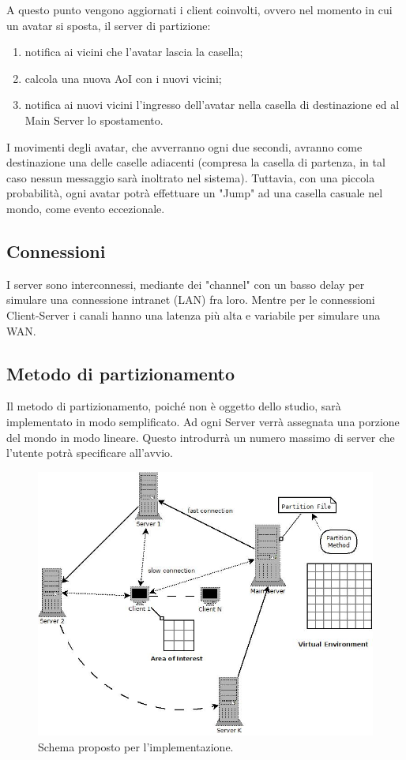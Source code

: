 \documentclass[a4paper, 11pt, oneside]{book}
\theoremstyle{definition}
\theoremstyle{remark}
\begin{document}
A questo punto vengono aggiornati i client coinvolti, ovvero nel momento
in cui un avatar si sposta, il server di partizione:
\begin{enumerate}
\item
notifica ai vicini che l'avatar lascia la casella;
\item
calcola una nuova AoI con i nuovi vicini;
\item
notifica ai nuovi vicini l'ingresso dell'avatar nella casella di
destinazione ed al Main Server lo spostamento.
\end{enumerate}

I movimenti degli avatar, che avverranno ogni due secondi, avranno come
destinazione una delle caselle adiacenti (compresa la casella di partenza,
in tal caso nessun messaggio sarà inoltrato nel sistema). Tuttavia, con una
piccola probabilità, ogni avatar potrà effettuare un "Jump" ad una casella
casuale nel mondo, come evento eccezionale.

\subsection{Connessioni}
I server sono interconnessi, mediante dei "channel" con un basso delay
per simulare una connessione intranet (LAN) fra loro. Mentre per le connessioni
Client-Server i canali hanno una latenza più alta e variabile per 
simulare una WAN.

\subsection{Metodo di partizionamento}
Il metodo di partizionamento, poiché non è oggetto dello studio, sarà
implementato in modo semplificato. Ad ogni Server verrà assegnata una porzione
del mondo in modo lineare. Questo introdurrà un numero massimo di server che
l'utente potrà specificare all'avvio.

\begin{figure}
\begin{center}
\includegraphics[scale=0.50]{schemaRing.jpeg}
\end{center}
\caption{Schema proposto per l'implementazione.}
\label{fig2}
\end{figure}
\end{document}
